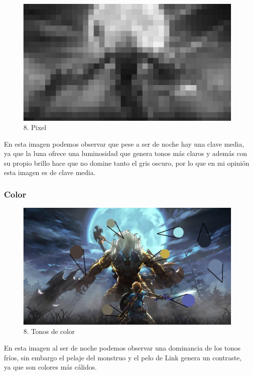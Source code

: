 \documentclass[12pt]{article}
\begin{document}
\begin{figure}[H]
      \centering
      \includegraphics[scale=0.25]{images/Raúl/Sección 8/Imagen 8 gris pixel.jpg}
      \caption{\small 8. Pixel}
    \end{figure}

 En esta imagen podemos observar que pese a ser de noche hay una clave media, ya que la luna ofrece una luminosidad que genera tonos más claros y además con su propio brillo hace que no domine tanto el gris oscuro, por lo que en mi opinión esta imagen es de clave media.

        \subsubsection{Color}

\begin{figure}[H]
      \centering
      \includegraphics[scale=0.25]{images/Raúl/Sección 8/Imagen 8 tonos.jpg}
      \caption{\small 8. Tonos de color}
    \end{figure}

En esta imagen al ser de noche podemos observar una dominancia de los tonos fríos, sin embargo el pelaje del monstruo y el pelo de Link genera un contraste, ya que son colores más cálidos.
\end{document}
